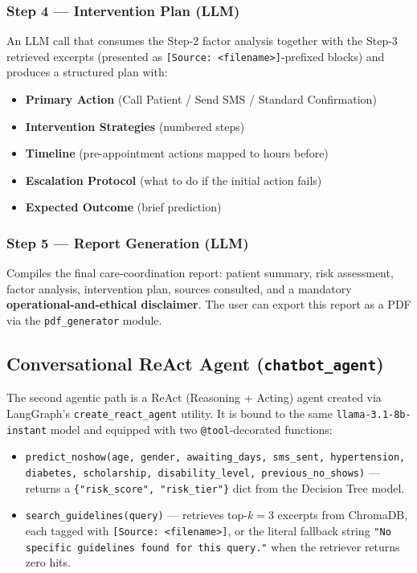\documentclass[11pt,a4paper]{article}
\begin{document}
\subsubsection*{Step 4 --- Intervention Plan (LLM)}
An LLM call that consumes the Step-2 factor analysis together with the
Step-3 retrieved excerpts (presented as
\texttt{[Source: <filename>]}-prefixed blocks) and produces a structured
plan with:
\begin{itemize}[leftmargin=1.2em,topsep=0pt,itemsep=0pt]
\item \textbf{Primary Action} (Call Patient / Send SMS / Standard Confirmation)
\item \textbf{Intervention Strategies} (numbered steps)
\item \textbf{Timeline} (pre-appointment actions mapped to hours before)
\item \textbf{Escalation Protocol} (what to do if the initial action fails)
\item \textbf{Expected Outcome} (brief prediction)
\end{itemize}

\subsubsection*{Step 5 --- Report Generation (LLM)}
Compiles the final care-coordination report: patient summary, risk
assessment, factor analysis, intervention plan, sources consulted, and a
mandatory \textbf{operational-and-ethical disclaimer}. The user can export
this report as a PDF via the \texttt{pdf\_generator} module.

\subsection{Conversational ReAct Agent (\texttt{chatbot\_agent})}

The second agentic path is a ReAct (Reasoning + Acting) agent created via
LangGraph's \texttt{create\_react\_agent} utility. It is bound to the same
\texttt{llama-3.1-8b-instant} model and equipped with two
\texttt{@tool}-decorated functions:

\begin{itemize}[leftmargin=1.2em]
\item \texttt{predict\_noshow(age, gender, awaiting\_days, sms\_sent,
      hypertension, diabetes, scholarship, disability\_level,
      previous\_no\_shows)} --- returns a \texttt{\{"risk\_score",
      "risk\_tier"\}} dict from the Decision Tree model.
\item \texttt{search\_guidelines(query)} --- retrieves top-$k{=}3$
      excerpts from ChromaDB, each tagged with
      \texttt{[Source: <filename>]}, or the literal fallback string
      \texttt{"No specific guidelines found for this query."} when the
      retriever returns zero hits.
\end{itemize}
\end{document}
